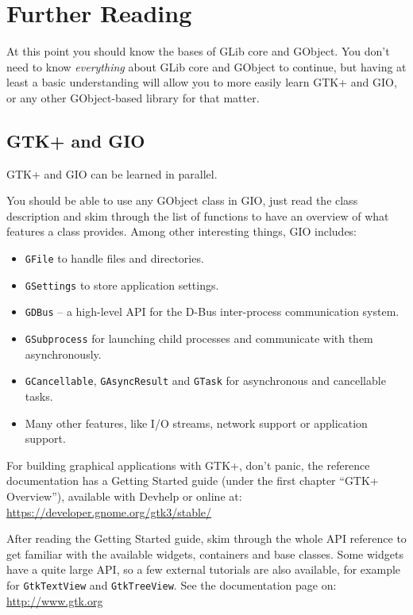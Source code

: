 \chapter{Further Reading}
\label{further-reading}

At this point you should know the bases of GLib core and GObject. You don't need to know \emph{everything} about GLib core and GObject to continue, but having at least a basic understanding will allow you to more easily learn GTK+ and GIO, or any other GObject-based library for that matter.

\section{GTK+ and GIO}
GTK+ and GIO can be learned in parallel.

You should be able to use any GObject class in GIO, just read the class description and skim through the list of functions to have an overview of what features a class provides. Among other interesting things, GIO includes:
\begin{itemize}
  \item \lstinline{GFile} to handle files and directories.
  \item \lstinline{GSettings} to store application settings.
  \item \lstinline{GDBus} -- a high-level API for the D-Bus inter-process communication system.
  \item \lstinline{GSubprocess} for launching child processes and communicate with them asynchronously.
  \item \lstinline{GCancellable}, \lstinline{GAsyncResult} and \lstinline{GTask} for asynchronous and cancellable tasks.
  \item Many other features, like I/O streams, network support or application support.
\end{itemize}

For building graphical applications with GTK+, don't panic, the reference documentation has a Getting Started guide (under the first chapter ``GTK+ Overview''), available with Devhelp or online at:\\
\url{https://developer.gnome.org/gtk3/stable/}

After reading the Getting Started guide, skim through the whole API reference to get familiar with the available widgets, containers and base classes. Some widgets have a quite large API, so a few external tutorials are also available, for example for \lstinline{GtkTextView} and \lstinline{GtkTreeView}. See the documentation page on:\\
\url{http://www.gtk.org}

